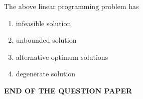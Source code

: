 \documentclass[journal,11pt,onecolumn]{IEEEtran}
\begin{document}
\begin{enumerate}[resume]
          The above linear programming problem has

          \begin{enumerate}

              \item infeasible solution

              \item unbounded solution

              \item alternative optimum solutions

              \item degenerate solution

          \end{enumerate}

\end{enumerate}

\vspace{1cm}

\centering\Large\textbf{END OF THE QUESTION PAPER}
\end{document}
